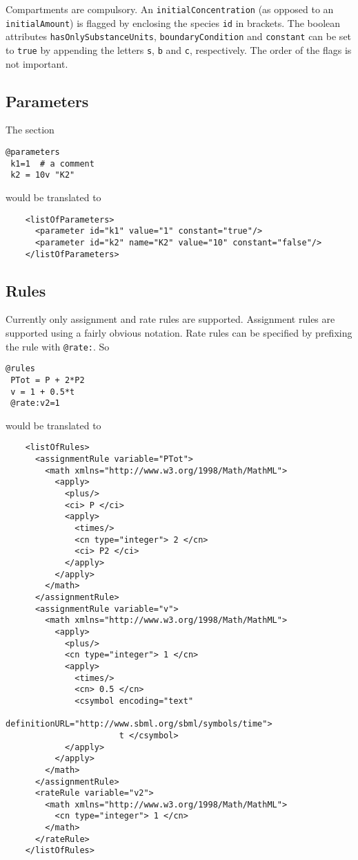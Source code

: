 \documentclass[11pt,a4paper]{article}
\begin{document}
Compartments are compulsory. An \verb$initialConcentration$ (as opposed
to an \verb$initialAmount$) is flagged by enclosing the species \verb$id$ in
brackets. The boolean attributes \verb$hasOnlySubstanceUnits$,
\verb$boundaryCondition$ and \verb$constant$ can be set to \verb$true$
by appending the letters \verb$s$, \verb$b$ and \verb$c$,
respectively. The order of the flags is not important.

\subsection{Parameters}

The section

{\small
\begin{verbatim}
@parameters
 k1=1  # a comment
 k2 = 10v "K2"
\end{verbatim}}

\noindent would be translated to

{\small
\begin{verbatim}
    <listOfParameters>
      <parameter id="k1" value="1" constant="true"/>
      <parameter id="k2" name="K2" value="10" constant="false"/>
    </listOfParameters>
\end{verbatim}}

\subsection{Rules}

Currently only assignment and rate rules are supported. Assignment
rules are supported using a fairly
obvious notation. Rate rules can be specified by prefixing the rule
with \verb$@rate:$. So

{\small
\begin{verbatim}
@rules
 PTot = P + 2*P2
 v = 1 + 0.5*t
 @rate:v2=1
\end{verbatim}
}

would be translated to    

{\small
\begin{verbatim}
    <listOfRules>
      <assignmentRule variable="PTot">
        <math xmlns="http://www.w3.org/1998/Math/MathML">
          <apply>
            <plus/>
            <ci> P </ci>
            <apply>
              <times/>
              <cn type="integer"> 2 </cn>
              <ci> P2 </ci>
            </apply>
          </apply>
        </math>
      </assignmentRule>
      <assignmentRule variable="v">
        <math xmlns="http://www.w3.org/1998/Math/MathML">
          <apply>
            <plus/>
            <cn type="integer"> 1 </cn>
            <apply>
              <times/>
              <cn> 0.5 </cn>
              <csymbol encoding="text" 
                       definitionURL="http://www.sbml.org/sbml/symbols/time">
                       t </csymbol>
            </apply>
          </apply>
        </math>
      </assignmentRule>
      <rateRule variable="v2">
        <math xmlns="http://www.w3.org/1998/Math/MathML">
          <cn type="integer"> 1 </cn>
        </math>
      </rateRule>
    </listOfRules>
\end{verbatim}
}
\end{document}
